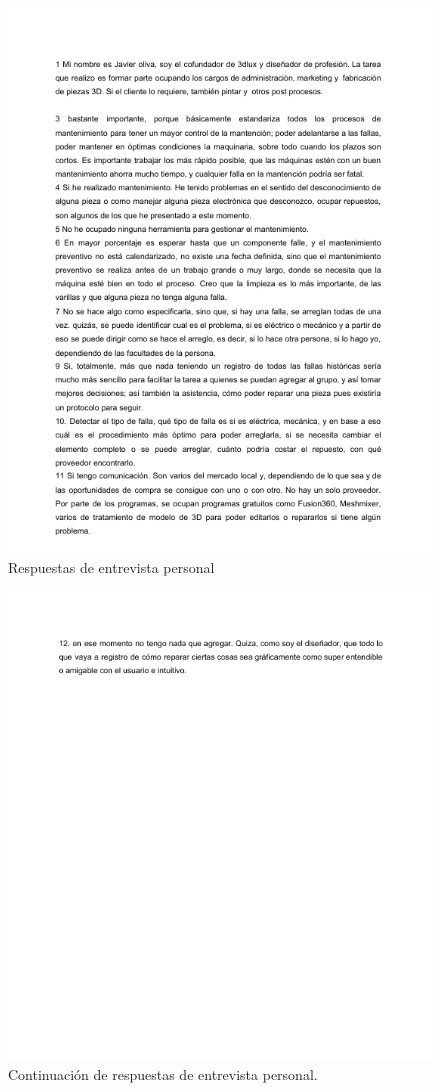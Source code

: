 \begin{figure}[H]
\centering
\includegraphics[scale=1]{images/resp1.png}
\caption{Respuestas de entrevista personal}

\end{figure}

\begin{figure}[H]
\centering
\includegraphics[scale=1]{images/resp2.png}
\caption{Continuación de respuestas de entrevista personal.}

\end{figure}